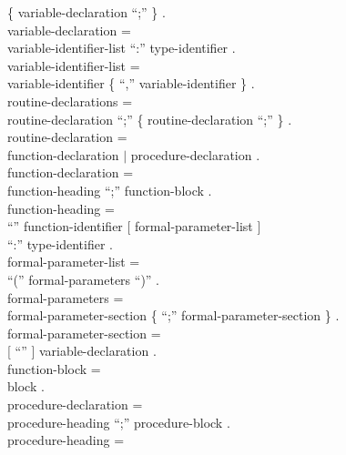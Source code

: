 \begin{grammar}
           \{ variable-declaration ``;'' \} .             \\
  {\GA}variable-declaration =                             \\
    {\GB}variable-identifier-list ``:'' type-identifier . \\
  {\GA}variable-identifier-list =                         \\
    {\GB}variable-identifier
           \{ ``,'' variable-identifier \} .              \\
  {\GA}routine-declarations =                             \\
    {\GB}routine-declaration ``;''
           \{ routine-declaration ``;'' \} .              \\
  {\GA}routine-declaration =                              \\
    {\GB}function-declaration $|$ procedure-declaration . \\
  {\GA}function-declaration =                             \\
    {\GB}function-heading ``;'' function-block .          \\
  {\GA}function-heading =                                 \\
    {\GB}``{\Function}'' function-identifier
           [ formal-parameter-list ]                      \\
      {\GC}``:'' type-identifier .                        \\
  {\GA}formal-parameter-list =                            \\
    {\GB}``('' formal-parameters ``)'' .                  \\
  {\GA}formal-parameters =                                \\
    {\GB}formal-parameter-section
           \{ ``;'' formal-parameter-section \} .         \\
  {\GA}formal-parameter-section =                         \\
    {\GB}[ ``{\Var}'' ] variable-declaration .            \\
  {\GA}function-block =                                   \\
    {\GB}block .                                          \\
  {\GA}procedure-declaration =                            \\
    {\GB}procedure-heading ``;'' procedure-block .        \\
  {\GA}procedure-heading =                                \\

\end{grammar}
